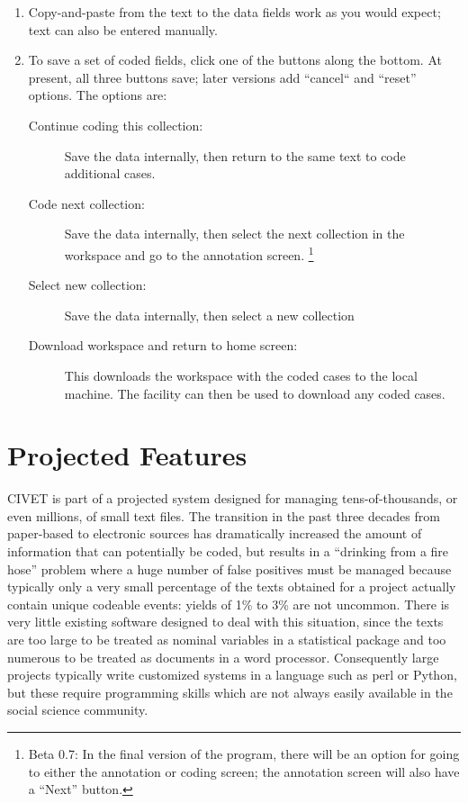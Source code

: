 \documentclass[letterpaper,10pt,english]{sphinxmanual}
\begin{document}
\begin{enumerate}
\item {} 
Copy-and-paste from the text to the data fields work as you would
expect; text can also be entered manually.

\item {} 
To save a set of coded fields, click one of the buttons along the
bottom. At present, all three buttons save; later versions add
``cancel“ and ``reset” options. The options are:
\begin{description}
\item[{Continue coding this collection:}] \leavevmode
Save the data internally, then return to the same text to code
additional cases.

\item[{Code next collection:}] \leavevmode
Save the data internally, then select the next collection in the
workspace and go to the annotation screen. \footnote{
Beta 0.7: In the final version of the program, there will be an
option for going to either the annotation or coding screen; the
annotation screen will also have a “Next” button.
}

\item[{Select new collection:}] \leavevmode
Save the data internally, then select a new collection

\item[{Download workspace and return to home screen:}] \leavevmode
This downloads the workspace with the coded cases to the local
machine. The {\hyperref[workspaces:sec-management]{\emph{}}} facility  can then be used to download any coded cases.

\end{description}

\end{enumerate}


\chapter{Projected Features}
\label{future::doc}\label{future:projected-features}
CIVET is part of a projected system designed for managing
tens-of-thousands, or even millions, of small text files. The transition
in the past three decades from paper-based to electronic sources has
dramatically increased the amount of information that can potentially be
coded, but results in a “drinking from a fire hose” problem where a huge
number of false positives must be managed because typically only a very
small percentage of the texts obtained for a project actually contain
unique codeable events: yields of 1\% to 3\% are not uncommon. There is
very little existing software designed to deal with this situation,
since the texts are too large to be treated as nominal variables in a
statistical package and too numerous to be treated as documents in a
word processor. Consequently large projects typically write customized
systems in a language such as perl or Python, but these require
programming skills which are not always easily available in the social
science community.
\end{document}
